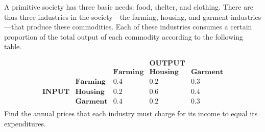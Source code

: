 \documentclass{ximera}
\begin{document}
\begin{example}\label{006965}
A primitive society has three basic needs: food, shelter, and clothing. There are thus three industries in the society---the farming, housing, and garment industries---that produce these commodities. Each of these industries consumes a certain proportion of the total output of each commodity according to the following table.

$$
\begin{array}{ccccc}
  & & & \textbf{OUTPUT} & \\
  & & \textbf{Farming} & \textbf{Housing} &    \textbf{Garment}  \\
  & \textbf{Farming} &    0.4  &    0.2 &    0.3  \\
 \textbf{INPUT} &   \textbf{Housing} &    0.2  &    0.6 &    0.4 \\
   & \textbf{Garment} &    0.4  &    0.2 &    0.3  \\
 \end{array}
 $$
Find the annual prices that each industry must charge for its income to equal its expenditures.


\end{example}
\end{document}
